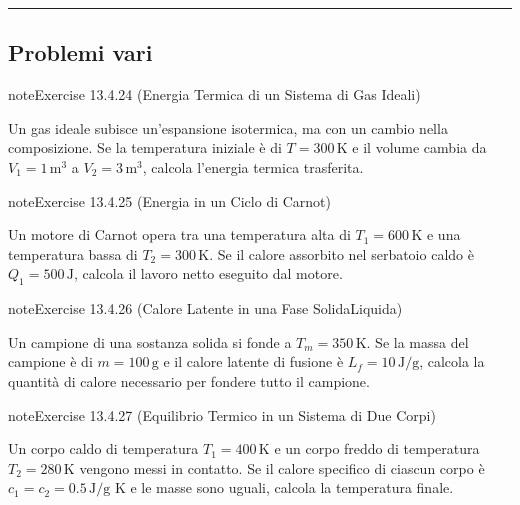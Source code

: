 \documentclass[letterpaper,10pt,italian]{jupyterBook}
\begin{document}
\bigskip\hrule\bigskip



\subsection{Problemi vari}
\label{\detokenize{ch/thermodynamics/matter-problems:problemi-vari}} \label{exercise:ch/thermodynamics/matter-problems-exercise-23}

\begin{sphinxadmonition}{note}{Exercise 13.4.24 (Energia Termica di un Sistema di Gas Ideali)}



\sphinxAtStartPar
Un gas ideale subisce un’espansione isotermica, ma con un cambio nella composizione. Se la temperatura iniziale è di \(T = 300 \, \text{K}\) e il volume cambia da \(V_1 = 1 \, \text{m}^3\) a \(V_2 = 3 \, \text{m}^3\), calcola l’energia termica trasferita.
\end{sphinxadmonition}
 \label{exercise:ch/thermodynamics/matter-problems-exercise-24}

\begin{sphinxadmonition}{note}{Exercise 13.4.25 (Energia in un Ciclo di Carnot)}



\sphinxAtStartPar
Un motore di Carnot opera tra una temperatura alta di \(T_1 = 600 \, \text{K}\) e una temperatura bassa di \(T_2 = 300 \, \text{K}\). Se il calore assorbito nel serbatoio caldo è \(Q_1 = 500 \, \text{J}\), calcola il lavoro netto eseguito dal motore.
\end{sphinxadmonition}
 \label{exercise:ch/thermodynamics/matter-problems-exercise-25}

\begin{sphinxadmonition}{note}{Exercise 13.4.26 (Calore Latente in una Fase Solida\sphinxhyphen{}Liquida)}



\sphinxAtStartPar
Un campione di una sostanza solida si fonde a \(T_m = 350 \, \text{K}\). Se la massa del campione è di \(m = 100 \, \text{g}\) e il calore latente di fusione è \(L_f = 10 \, \text{J/g}\), calcola la quantità di calore necessario per fondere tutto il campione.
\end{sphinxadmonition}
 \label{exercise:ch/thermodynamics/matter-problems-exercise-26}

\begin{sphinxadmonition}{note}{Exercise 13.4.27 (Equilibrio Termico in un Sistema di Due Corpi)}



\sphinxAtStartPar
Un corpo caldo di temperatura \(T_1 = 400 \, \text{K}\) e un corpo freddo di temperatura \(T_2 = 280 \, \text{K}\) vengono messi in contatto. Se il calore specifico di ciascun corpo è \(c_1 = c_2 = 0.5 \, \text{J/g K}\) e le masse sono uguali, calcola la temperatura finale.
\end{sphinxadmonition}
 \label{exercise:ch/thermodynamics/matter-problems-exercise-27}
\end{document}
